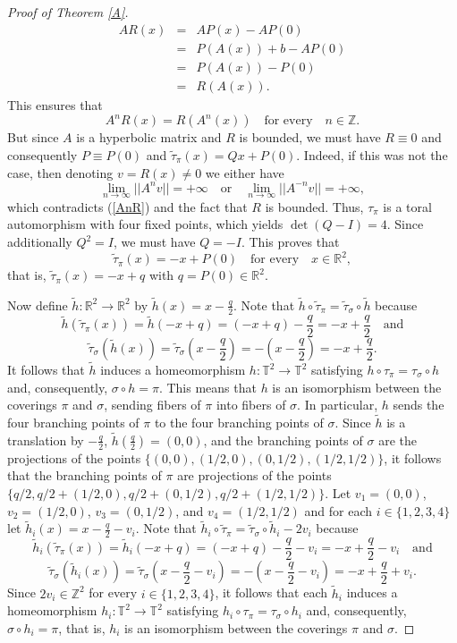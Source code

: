 \documentclass{amsart}
\theoremstyle{plain}
\theoremstyle{definition}
\newcommand{\T}{\mathbb{T}}
\newcommand{\Z}{\mathbb{Z}}
\newcommand{\R}{\mathbb{R}}
\begin{document}
\begin{proof}[Proof of Theorem \ref{A}]
\begin{eqnarray*}
AR(x)&=&AP(x)-AP(0)\\
&=&P(A(x))+b-AP(0)\\
&=&P(A(x))-P(0)\\
&=&R(A(x)).
\end{eqnarray*}
This ensures that 
\begin{equation}\label{AnR}
A^nR(x)=R(A^n(x)) \,\,\,\,\,\, \text{for every} \,\,\,\,\,\, n\in \Z.
\end{equation}
But since $A$ is a hyperbolic matrix and $R$ is bounded, we must have $R\equiv 0$
and consequently $P\equiv P(0)$ and $\tilde\tau_{\pi}(x)=Qx+P(0)$.
Indeed, if this was not the case, then denoting $v=R(x)\neq 0$ we either have
$$\lim_{n\to \infty}||A^nv||=+\infty \,\,\,\,\,\, \text{or} \,\,\,\,\,\, \lim_{n\to\infty}||A^{-n}v||=+\infty,$$ which contradicts (\ref{AnR}) and the fact that $R$ is bounded.
Thus, $\tau_{\pi}$ is a toral automorphism 
with four fixed points, which yields $\det (Q-I)=4$. Since additionally $Q^2=I$, we must have $Q=-I$. This proves that 
$$\tilde\tau_{\pi}(x)=-x+P(0) \,\,\,\,\,\, \text{for every} \,\,\,\,\,\, x\in\R^2,$$
that is, $\tilde\tau_{\pi}(x)=-x+q$ with $q=P(0)\in\R^2$.


Now define $\tilde h\colon \mathbb{R}^{2}\to \mathbb{R}^{2}$ by $\tilde h(x)=x-\frac{q}{2}$. Note that $\tilde h\circ\tilde\tau_{\pi}=\tilde\tau_{\sigma}\circ\tilde h$ because
$$\tilde h(\tilde{\tau}_{\pi}(x))=\tilde h(-x+q)=(-x+q)-\frac{q}{2}=-x+\frac{q}{2} \,\,\,\,\,\, \text{and}$$
$$\tilde{\tau}_{\sigma}(\tilde h(x))=\tilde{\tau}_{\sigma}\left(x-\frac{q}{2}\right)=-\left(x-\frac{q}{2}\right)=-x+\frac{q}{2}.$$
It follows that $\tilde h$ induces a homeomorphism $h\colon \mathbb{T}^{2}\to \mathbb{T}^{2}$ satisfying $h\circ\tau_{\pi}=\tau_{\sigma}\circ h$ and, consequently, $\sigma\circ h=\pi$. 
This means that $h$ is an isomorphism between the coverings $\pi$ and $\sigma$, sending fibers of $\pi$ into fibers of $\sigma$. In particular, $h$ sends the four branching points of $\pi$ to the four branching points of $\sigma$. Since $\tilde h$ is a translation by $-\frac{q}{2}$, $\tilde h(\frac{q}{2})=(0,0)$, and the branching points of $\sigma$ are the projections of the points $\{(0,0), (1/2, 0), (0, 1/2), (1/2, 1/2)\}$, it follows that the branching points of $\pi$ are projections of the points $\{q/2, q/2+(1/2, 0), q/2+(0, 1/2), q/2+(1/2, 1/2)\}$. Let $v_1=(0,0)$, $v_2=(1/2, 0)$, $v_3=(0,1/2)$, and $v_4=(1/2,1/2)$ and for each $i\in\{1,2,3,4\}$ let $\tilde h_i(x)=x-\frac{q}{2}-v_i$. Note that $\tilde h_i\circ\tilde\tau_{\pi}=\tilde\tau_{\sigma}\circ\tilde h_i-2v_i$ because
$$\tilde h_i(\tilde{\tau}_{\pi}(x))=\tilde h_i(-x+q)=(-x+q)-\frac{q}{2}-v_i=-x+\frac{q}{2}-v_i \,\,\,\,\,\, \text{and}$$
$$\tilde{\tau}_{\sigma}(\tilde h_i(x))=\tilde{\tau}_{\sigma}\left(x-\frac{q}{2}-v_i\right)=-\left(x-\frac{q}{2}-v_i\right)=-x+\frac{q}{2}+v_i.$$ Since $2v_i\in\Z^2$ for every $i\in\{1,2,3,4\}$, it follows that each $\tilde h_i$ induces a homeomorphism $h_i\colon\T^2\to\T^2$ satisfying $h_i\circ\tau_{\pi}=\tau_{\sigma}\circ h_i$ and, consequently, $\sigma\circ h_i=\pi$, that is, $h_i$ is an isomorphism between the coverings $\pi$ and $\sigma$.


\end{proof}
\end{document}

